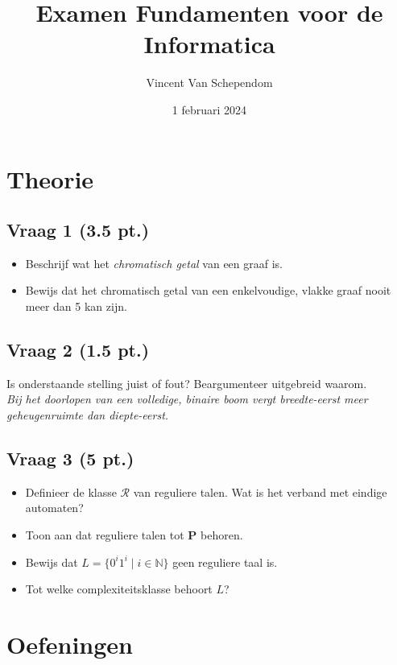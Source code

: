 \documentclass[kulak]{kulakarticle} %
\title{Examen Fundamenten voor de Informatica}
\author{Vincent Van Schependom}
\date{1 februari 2024}
\newcommand{\N}{\mathbb{N}}
\begin{document}
	\maketitle

	\section*{Theorie}

	\subsection*{Vraag 1 (3.5 pt.)}

	\begin{itemize}
		\item Beschrijf wat het \textit{chromatisch getal} van een graaf is.
		\item Bewijs dat het chromatisch getal van een enkelvoudige, vlakke graaf nooit meer dan 5 kan zijn.
	\end{itemize}

	\subsection*{Vraag 2 (1.5 pt.)}

	Is onderstaande stelling juist of fout? Beargumenteer uitgebreid waarom.\\
	\textit{Bij het doorlopen van een volledige, binaire boom vergt breedte-eerst meer geheugenruimte dan diepte-eerst.}

	\subsection*{Vraag 3 (5 pt.)}

	\begin{itemize}
		\item Definieer de klasse $\mathcal{R}$ van reguliere talen. Wat is het verband met eindige automaten?
		\item Toon aan dat reguliere talen tot \textbf{P} behoren.
		\item Bewijs dat \(L= \{ 0^i1^i \mid i \in \N \} \) geen reguliere taal is.
		\item Tot welke complexiteitsklasse behoort \(L\)?
	\end{itemize}

	\newpage

	\section*{Oefeningen}
\end{document}
